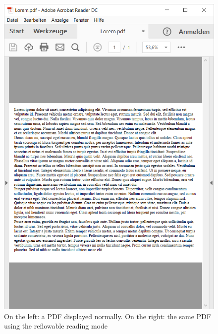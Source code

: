 \begin{figure}[h]
\begin{minipage}{0.5\textwidth}
		\includegraphics[width=\linewidth]{figures/loremReflowable.png}
	\end{minipage}

	\caption{On the left: a PDF displayed normally. On the right: the same PDF using the reflowable reading mode}
	\label{fig:reflowablePDF}
\end{figure}

